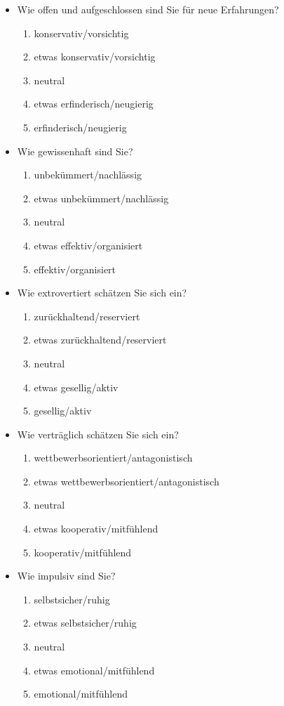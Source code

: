 \documentclass[11pt,a4paper,headsepline,twoside,toc=bibliography]{scrreprt}
\begin{document}
\begin{itemize}
	\item Wie offen und aufgeschlossen sind Sie für neue Erfahrungen?
	\begin{enumerate}
		\item konservativ/vorsichtig
		\item etwas konservativ/vorsichtig
		\item neutral
		\item etwas erfinderisch/neugierig
		\item erfinderisch/neugierig
	\end{enumerate}
	\item Wie gewissenhaft sind Sie?
	\begin{enumerate}
		\item unbekümmert/nachlässig
		\item etwas unbekümmert/nachlässig
		\item neutral
		\item etwas effektiv/organisiert
		\item effektiv/organisiert
	\end{enumerate}
	\item Wie extrovertiert schätzen Sie sich ein?
	\begin{enumerate}
		\item zurückhaltend/reserviert
		\item etwas zurückhaltend/reserviert
		\item neutral
		\item etwas gesellig/aktiv
		\item gesellig/aktiv
	\end{enumerate}
	\item Wie verträglich schätzen Sie sich ein?	
	\begin{enumerate}
		\item wettbewerbsorientiert/antagonistisch
		\item etwas wettbewerbsorientiert/antagonistisch
		\item neutral
		\item etwas kooperativ/mitfühlend
		\item kooperativ/mitfühlend
	\end{enumerate}
	\item Wie impulsiv sind Sie?	
	\begin{enumerate}
		\item selbstsicher/ruhig
		\item etwas selbstsicher/ruhig
		\item neutral
		\item etwas emotional/mitfühlend
		\item emotional/mitfühlend
	\end{enumerate}
\end{itemize}
\end{document}
